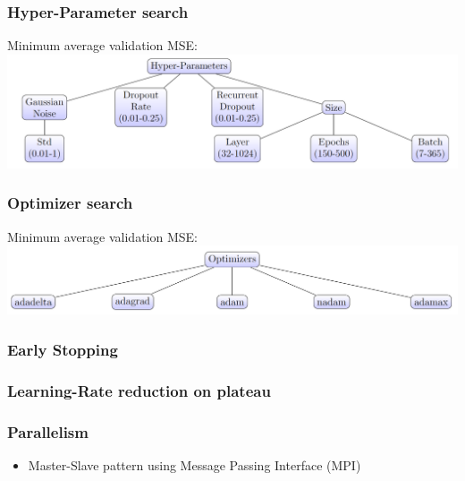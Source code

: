 \documentclass[11pt]{article}
\makeatletter
\def\maxwidth{\ifdim\Gin@nat@width>\linewidth\linewidth
    \else\Gin@nat@width\fi}
\let\Oldincludegraphics\includegraphics
\renewcommand{\includegraphics}[1]{\Oldincludegraphics[width=.8\maxwidth]{#1}}
\providecommand{\tightlist}{%
      \setlength{\itemsep}{0pt}\setlength{\parskip}{0pt}}
\makeatother
\begin{document}
    \hypertarget{hyper-parameter-search}{%
\subsubsection{Hyper-Parameter search}\label{hyper-parameter-search}}

    Minimum average validation MSE:
\includegraphics{pics/hyperparameters.png}

    \hypertarget{optimizer-search}{%
\subsubsection{Optimizer search}\label{optimizer-search}}

    Minimum average validation MSE: \includegraphics{pics/optimizers.png}

    \hypertarget{early-stopping}{%
\subsubsection{Early Stopping}\label{early-stopping}}

    \hypertarget{learning-rate-reduction-on-plateau}{%
\subsubsection{Learning-Rate reduction on
plateau}\label{learning-rate-reduction-on-plateau}}

    \hypertarget{parallelism}{%
\subsubsection{Parallelism}\label{parallelism}}

\begin{itemize}
\tightlist
\item
  Master-Slave pattern using Message Passing Interface (MPI)
\end{itemize}
\end{document}
